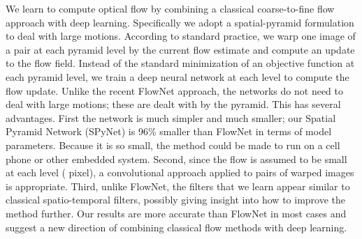 We learn to compute optical flow by combining a classical coarse-to-fine flow approach with deep learning.
Specifically we adopt a spatial-pyramid formulation to deal with large motions.
According to standard practice, we warp one image of a pair at each pyramid level by the current flow estimate and compute an update to the flow field.
Instead of the standard minimization of an objective function at each pyramid level, we train a deep neural network at each level to compute the flow update.
Unlike the recent FlowNet approach, the networks do not need to deal with large motions; these are dealt with by the pyramid.  
This has several advantages. First the network is much simpler and much smaller; our Spatial Pyramid Network (SPyNet) is 96\% smaller than FlowNet in terms of model parameters.
Because it is so small, the method could be made to run on a cell phone or other embedded system.
Second, since the flow is assumed to be small at each level ( pixel), a convolutional approach applied to pairs of warped images is appropriate.
Third, unlike FlowNet, the filters that we learn appear similar to classical spatio-temporal filters, possibly giving insight into how to improve the method further.
Our results are more accurate than FlowNet in most cases and suggest a new direction of combining classical flow methods with deep learning. 
%
